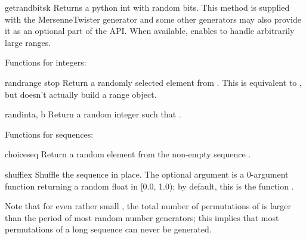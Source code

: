 \begin{funcdesc}{getrandbits}{k}
  Returns a python  int with  random bits.
  This method is supplied with the MersenneTwister generator and some
  other generators may also provide it as an optional part of the API.
  When available,  enables 
  to handle arbitrarily large ranges.
\end{funcdesc} 

Functions for integers:

\begin{funcdesc}{randrange}{ stop}
  Return a randomly selected element from .  This is equivalent to
  ,
  but doesn't actually build a range object.
\end{funcdesc}

\begin{funcdesc}{randint}{a, b}
  Return a random integer  such that
  .
\end{funcdesc}


Functions for sequences:

\begin{funcdesc}{choice}{seq}
  Return a random element from the non-empty sequence .
\end{funcdesc}

\begin{funcdesc}{shuffle}{x}
  Shuffle the sequence  in place.
  The optional argument  is a 0-argument function
  returning a random float in [0.0, 1.0); by default, this is the
  function .

  Note that for even rather small , the total
  number of permutations of  is larger than the period of most
  random number generators; this implies that most permutations of a
  long sequence can never be generated.
\end{funcdesc}

